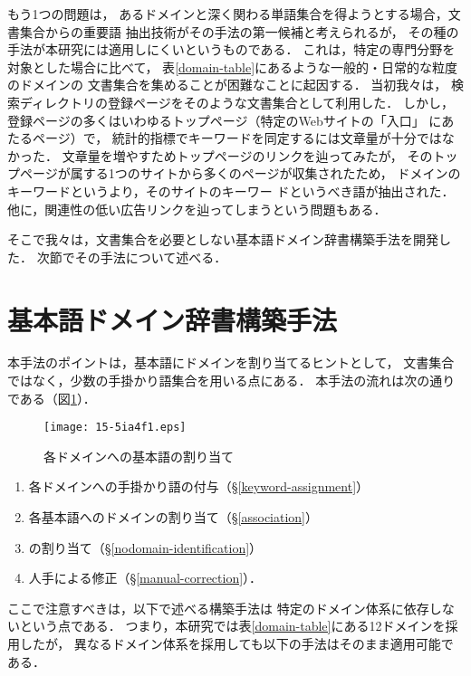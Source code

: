 \documentclass[japanese]{jnlp_1.4}
\newcommand{\dom}[1]{}
\begin{document}
もう1つの問題は，
あるドメインと深く関わる単語集合を得ようとする場合，文書集合からの重要語
抽出技術がその手法の第一候補と考えられるが，
その種の手法が本研究には適用しにくいというものである．
これは，特定の専門分野を対象とした場合に比べて，
表\ref{domain-table}にあるような一般的・日常的な粒度のドメインの
文書集合を集めることが困難なことに起因する．
当初我々は，
検索ディレクトリの登録ページをそのような文書集合として利用した．
しかし，登録ページの多くはいわゆるトップページ（特定のWebサイトの「入口」
にあたるページ）で，
統計的指標でキーワードを同定するには文章量が十分ではなかった．
文章量を増やすためトップページのリンクを辿ってみたが，
そのトップページが属する1つのサイトから多くのページが収集されたため，
ドメインのキーワードというより，そのサイトのキーワー
ドというべき語が抽出された．
他に，関連性の低い広告リンクを辿ってしまうという問題もある．

そこで我々は，文書集合を必要としない基本語ドメイン辞書構築手法を開発した．
次節でその手法について述べる．



\section{基本語ドメイン辞書構築手法 \label{domain-construction-method}}

本手法のポイントは，基本語にドメインを割り当てるヒントとして，
文書集合ではなく，少数の手掛かり語集合を用いる点にある．
本手法の流れは次の通りである（図\ref{association-figure}）．


\begin{figure}[p]
\begin{center}
\texttt{[image: 15-5ia4f1.eps]}
\end{center}
\caption{各ドメインへの基本語の割り当て}
\label{association-figure}
\end{figure}

\begin{enumerate}
 \item 各ドメインへの手掛かり語の付与（\S\ref{keyword-assignment}）
 \item 各基本語へのドメインの割り当て（\S\ref{association}）
 \item \dom{ドメイン無し}の割り当て（\S\ref{nodomain-identification}）
 \item 人手による修正（\S\ref{manual-correction}）．
\end{enumerate}

ここで注意すべきは，以下で述べる構築手法は
特定のドメイン体系に依存しないという点である．
つまり，本研究では表\ref{domain-table}にある12ドメインを採用したが，
異なるドメイン体系を採用しても以下の手法はそのまま適用可能である．
\end{document}
